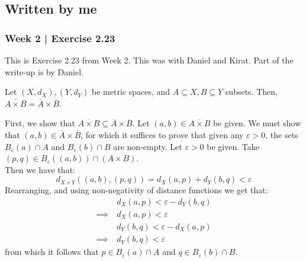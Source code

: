 \subsection{Written by me} \vspace{-.1in}
\subsubsection{Week 2 | Exercise 2.23} \vspace{-.05in}

This is Exercise 2.23 from Week 2.
This was with Daniel and Kirat. Part of the write-up is by Daniel.

\begin{exr}[num=2.23]
    Let $ (X, d_{X}), (Y, d_{Y}) $ be metric spaces,
    and $ A \subseteq X, B \subseteq Y $ subsets.
    Then, $ \overline{A \times B} = \overline{A} \times \overline{B} $.
\end{exr}

\begin{pf}[source=Daniel]
    First, we show that $ \overline{A \times B} \subseteq \overline{A} \times
    \overline{B} $. \vsp
    Let $ (a, b) \in \overline{A \times B} $ be given.
    We must show that $ (a, b) \in \overline{A} \times \overline{B} $,
    for which it suffices to prove that given any $ \varepsilon > 0 $,
    the sets $ B_{\varepsilon}(a) \cap A $ and $ B_{\varepsilon}(b) \cap B $ are
    non-empty. \vsp
    Let $ \varepsilon > 0 $ be given.
    Take $ (p, q) \in B_{\varepsilon}((a,b)) \cap (A \times B) $. \\
    Then we have that:
    \begin{equation*}
        d_{X \times Y}((a,b), (p,q)) = d_X(a, p) + d_Y(b, q) < \varepsilon
    \end{equation*}
    Rearranging, and using non-negativity of distance functions we get that:
    \begin{align*}
        & d_X(a, p) < \varepsilon - d_Y(b, q) \\
        \implies \ & d_X(a, p) < \varepsilon \\
        & d_Y(b, q) < \varepsilon - d_X(a, p) \\
        \implies \ & d_Y(b, q) < \varepsilon
    \end{align*}
    from which it follows that $p\in B_{\varepsilon}(a)\cap A$ and $q\in
    B_{\varepsilon}(b)\cap B$.
\end{pf}

